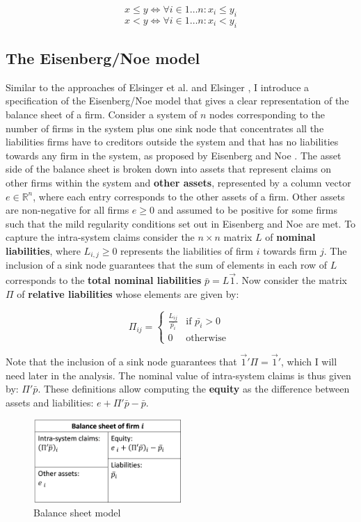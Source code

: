 \documentclass[12pt,a4paper]{article}
\begin{document}
\[ x \le y \Leftrightarrow \forall i \in 1 \dots n \colon x_i \le y_i \]
\[ x < y \Leftrightarrow \forall i \in 1 \dots n \colon x_i < y_i \]

\subsection{The Eisenberg/Noe model}
Similar to the approaches of Elsinger et al. \cite{Els06} and Elsinger \cite{Els09}, I introduce a specification of the Eisenberg/Noe \cite{Eis01} model that gives a clear representation of the balance sheet of a firm. Consider a system of $n$ nodes corresponding to the number of firms in the system plus one sink node that concentrates all the liabilities firms have to creditors outside the system and that has no liabilities towards any firm in the system, as proposed by Eisenberg and Noe \cite{Eis01}. The asset side of the balance sheet is broken down into assets that represent claims on other firms within the system and \textbf{other assets}, represented by a column vector $e \in \mathbb{R}^n$, where each entry corresponds to the other assets of a firm. Other assets are non-negative for all firms $e \ge 0$ and assumed to be positive for some firms such that the mild regularity conditions set out in Eisenberg and Noe \cite{Eis01} are met. To capture the intra-system claims consider the $n \times n$ matrix $L$ of \textbf{nominal liabilities}, where $L_{i,j} \ge 0$ represents the liabilities of firm $i$ towards firm $j$. The inclusion of a sink node guarantees that the sum of elements in each row of $L$ corresponds to the \textbf{total nominal liabilities} $\bar{p}=L \vec{1}$. Now consider the matrix $\Pi$ of \textbf{relative liabilities} whose elements are given by: 

\[
\Pi_{ij} = \begin{cases} 
\frac{L_{ij}}{\bar{p_i}} &\mbox{if } \bar{p_i} > 0 \\ 
0 & \mbox{otherwise } \end{cases}
\]

Note that the inclusion of a sink node guarantees that $\vec{1}' \Pi =\vec{1}'$, which I will need later in the analysis. The nominal value of intra-system claims is thus given by: $\Pi' \bar{p}$. These definitions allow computing the \textbf{equity} as the difference between assets and liabilities: $e+\Pi' \bar{p}-\bar{p}$.

\begin{figure}[H]
\centering
\includegraphics[width=0.5\textwidth]{BalanceSheet.png}
\caption{\label{fig:BalanceSheet}Balance sheet model}
\end{figure}
\end{document}
